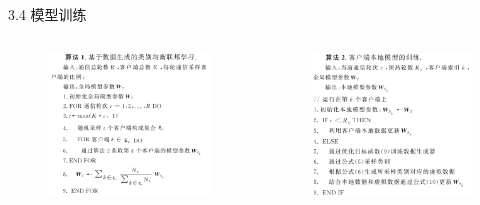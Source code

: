 \documentclass{sintefbeamer}
\theoremstyle{definition}
\begin{document}
\begin{frame}{3.4 模型训练}


\begin{columns}
\begin{column}{0.5\textwidth}
\begin{figure}[ht]
\centering
\includegraphics[width=1\textwidth]{images/algo1}
\end{figure}

\end{column}
\begin{column}{0.5\textwidth}
\begin{figure}[ht]
\centering
\includegraphics[width=1\textwidth]{images/algo2}
\end{figure}
\end{column}
\end{columns}


\end{frame}
\end{document}
